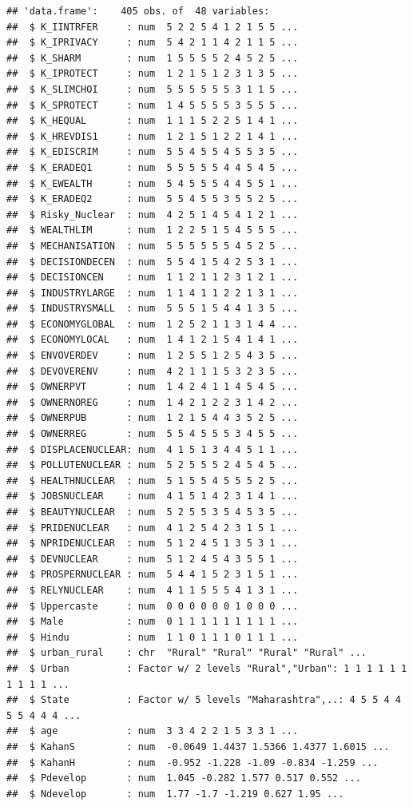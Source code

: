 \documentclass[
]{article}
\begin{document}
\begin{verbatim}
## 'data.frame':    405 obs. of  48 variables:
##  $ K_IINTRFER     : num  5 2 2 5 4 1 2 1 5 5 ...
##  $ K_IPRIVACY     : num  5 4 2 1 1 4 2 1 1 5 ...
##  $ K_SHARM        : num  1 5 5 5 5 2 4 5 2 5 ...
##  $ K_IPROTECT     : num  1 2 1 5 1 2 3 1 3 5 ...
##  $ K_SLIMCHOI     : num  5 5 5 5 5 5 3 1 1 5 ...
##  $ K_SPROTECT     : num  1 4 5 5 5 5 3 5 5 5 ...
##  $ K_HEQUAL       : num  1 1 1 5 2 2 5 1 4 1 ...
##  $ K_HREVDIS1     : num  1 2 1 5 1 2 2 1 4 1 ...
##  $ K_EDISCRIM     : num  5 5 4 5 5 4 5 5 3 5 ...
##  $ K_ERADEQ1      : num  5 5 5 5 5 4 4 5 4 5 ...
##  $ K_EWEALTH      : num  5 4 5 5 5 4 4 5 5 1 ...
##  $ K_ERADEQ2      : num  5 5 4 5 5 3 5 5 2 5 ...
##  $ Risky_Nuclear  : num  4 2 5 1 4 5 4 1 2 1 ...
##  $ WEALTHLIM      : num  1 2 2 5 1 5 4 5 5 5 ...
##  $ MECHANISATION  : num  5 5 5 5 5 5 4 5 2 5 ...
##  $ DECISIONDECEN  : num  5 5 4 1 5 4 2 5 3 1 ...
##  $ DECISIONCEN    : num  1 1 2 1 1 2 3 1 2 1 ...
##  $ INDUSTRYLARGE  : num  1 1 4 1 1 2 2 1 3 1 ...
##  $ INDUSTRYSMALL  : num  5 5 5 1 5 4 4 1 3 5 ...
##  $ ECONOMYGLOBAL  : num  1 2 5 2 1 1 3 1 4 4 ...
##  $ ECONOMYLOCAL   : num  1 4 1 2 1 5 4 1 4 1 ...
##  $ ENVOVERDEV     : num  1 2 5 5 1 2 5 4 3 5 ...
##  $ DEVOVERENV     : num  4 2 1 1 1 5 3 2 3 5 ...
##  $ OWNERPVT       : num  1 4 2 4 1 1 4 5 4 5 ...
##  $ OWNERNOREG     : num  1 4 2 1 2 2 3 1 4 2 ...
##  $ OWNERPUB       : num  1 2 1 5 4 4 3 5 2 5 ...
##  $ OWNERREG       : num  5 5 4 5 5 5 3 4 5 5 ...
##  $ DISPLACENUCLEAR: num  4 1 5 1 3 4 4 5 1 1 ...
##  $ POLLUTENUCLEAR : num  5 2 5 5 5 2 4 5 4 5 ...
##  $ HEALTHNUCLEAR  : num  5 1 5 5 4 5 5 5 2 5 ...
##  $ JOBSNUCLEAR    : num  4 1 5 1 4 2 3 1 4 1 ...
##  $ BEAUTYNUCLEAR  : num  5 2 5 5 3 5 4 5 3 5 ...
##  $ PRIDENUCLEAR   : num  4 1 2 5 4 2 3 1 5 1 ...
##  $ NPRIDENUCLEAR  : num  5 1 2 4 5 1 3 5 3 1 ...
##  $ DEVNUCLEAR     : num  5 1 2 4 5 4 3 5 5 1 ...
##  $ PROSPERNUCLEAR : num  5 4 4 1 5 2 3 1 5 1 ...
##  $ RELYNUCLEAR    : num  4 1 1 5 5 5 4 1 3 1 ...
##  $ Uppercaste     : num  0 0 0 0 0 0 1 0 0 0 ...
##  $ Male           : num  0 1 1 1 1 1 1 1 1 1 ...
##  $ Hindu          : num  1 1 0 1 1 1 0 1 1 1 ...
##  $ urban_rural    : chr  "Rural" "Rural" "Rural" "Rural" ...
##  $ Urban          : Factor w/ 2 levels "Rural","Urban": 1 1 1 1 1 1 1 1 1 1 ...
##  $ State          : Factor w/ 5 levels "Maharashtra",..: 4 5 5 4 4 5 5 4 4 4 ...
##  $ age            : num  3 3 4 2 2 1 5 3 3 1 ...
##  $ KahanS         : num  -0.0649 1.4437 1.5366 1.4377 1.6015 ...
##  $ KahanH         : num  -0.952 -1.228 -1.09 -0.834 -1.259 ...
##  $ Pdevelop       : num  1.045 -0.282 1.577 0.517 0.552 ...
##  $ Ndevelop       : num  1.77 -1.7 -1.219 0.627 1.95 ...
\end{verbatim}
\end{document}
